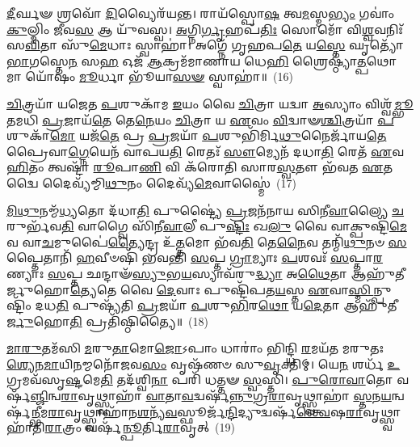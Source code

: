 \-\ul{𑌦𑍀}\-𑌰𑍍𑌘𑍟 𑌶𑍍𑌰𑌵𑍋᳴ \ul{𑌦𑌿}\-𑌵𑍍𑌯𑍈𑌰᳴𑌯𑌨𑍍𑌤। 𑌰𑌾𑌯᳴𑌸𑍍𑌪𑍋\-\ul{𑌷} 𑌤𑍍𑌵\-\ul{𑌮}\-𑌸𑍍𑌮\-\ul{𑌭𑍍𑌯𑌂} 𑌗𑌵𑌾𑌂॑ \ul{𑌕𑍁}\-𑌲𑍍𑌮𑌿𑌂 \ul{𑌜𑍀}\-𑌵\-\ul{𑌸} 𑌆 𑌯𑍁᳴𑌵𑌸𑍍𑌵। \ul{𑌅}\-𑌗𑍍𑌨𑌿\-\ul{𑌰𑍍𑌗𑍃}\-𑌹𑌪᳴\-\ul{𑌤𑌿𑌃} 𑌸𑍋𑌮𑍋᳴ 𑌵𑌿\-\ul{𑌶𑍍𑌵}\-𑌵𑌨𑌿𑌃᳴ 𑌸\-\ul{𑌵𑌿}\-𑌤𑌾 𑌸𑍁᳴\-\ul{𑌮𑍇}\-𑌧𑌾𑌃 𑌸𑍍𑌵𑌾𑌹𑌾॑। 𑌅𑌗𑍍𑌨𑍇᳴ 𑌗𑍃𑌹𑌪\-\ul{𑌤𑍇} 𑌯\-\ul{𑌸𑍍𑌤𑍇} 𑌘𑍃𑌤𑍍𑌯𑍋᳴ \ul{𑌭𑌾}\-𑌗𑌸𑍍𑌤𑍇\-\ul{𑌨} 𑌸\-\ul{𑌹} 𑌓𑌜᳴ \ul{𑌆}\-𑌕𑍍𑌰𑌮᳴𑌮𑌾𑌣𑌾𑌯 𑌧𑍇\-\ul{𑌹𑌿} 𑌶𑍍𑌰𑍈𑌷𑍍𑌠𑍍𑌯𑌾॑\-\ul{𑌤𑍍𑌪}\-𑌥𑍋 𑌮𑌾 𑌯𑍋᳴𑌷𑌂 \ul{𑌮𑍂}\-𑌰𑍍𑌧𑌾 𑌭𑍂᳴𑌯𑌾\-\ul{𑌸}\-\-\ul{𑍟} 𑌸𑍍𑌵𑌾𑌹𑌾॑॥~(16)

{\anuvakamend[{\-\ul{𑌅}\-𑌮𑍃𑌤᳴\-\ul{𑌮}\-𑌷𑍍𑌟𑌾𑌤𑍍𑌰𑌿𑍞᳴𑌶𑌚𑍍𑌚}]}%

\-\ul{𑌚𑌿}\-𑌤𑍍𑌰𑌯𑌾᳴ 𑌯𑌜𑍇𑌤 \ul{𑌪}\-𑌶𑍁𑌕𑌾᳴𑌮 \ul{𑌇}\-𑌯𑌂 𑌵𑍈 \ul{𑌚𑌿}\-𑌤𑍍𑌰𑌾 𑌯𑌦𑍍𑌵𑌾 \ul{𑌅}\-𑌸𑍍𑌯𑌾𑌂 𑌵𑌿𑌶𑍍𑌵᳴\-\ul{𑌮𑍍𑌭𑍂}\-𑌤𑌮𑌧𑌿᳴ \ul{𑌪𑍍𑌰}\-𑌜𑌾𑌯᳴\-\ul{𑌤𑍇} 𑌤𑍇\-\ul{𑌨𑍇}\-𑌯𑌂 \ul{𑌚𑌿}\-𑌤𑍍𑌰𑌾 𑌯 \ul{𑌏}\-𑌵𑌂 \ul{𑌵𑌿}\-𑌦𑍍𑌵𑌾𑍟\-\ul{𑌶𑍍𑌚𑌿}\-𑌤𑍍𑌰𑌯𑌾᳴ \ul{𑌪}\-𑌶𑍁𑌕𑌾᳴\-\ul{𑌮𑍋} 𑌯𑌜᳴\-\ul{𑌤𑍇} 𑌪𑍍𑌰 \ul{𑌪𑍍𑌰}\-𑌜𑌯𑌾᳴ \ul{𑌪}\-𑌶𑍁𑌭𑌿᳴𑌰𑍍𑌮𑌿\-\ul{𑌥𑍁}\-𑌨𑍈𑌰𑍍𑌜𑌾᳴𑌯\-\ul{𑌤𑍇} 𑌪𑍍𑌰𑍈𑌵𑌾\-\ul{𑌗𑍍𑌨𑍇}\-𑌯𑍇𑌨᳴ 𑌵𑌾𑌪𑌯\-\ul{𑌤𑌿} 𑌰𑍇𑌤𑌃᳴ \ul{𑌸𑍗}\-𑌮𑍍𑌯𑍇𑌨᳴ 𑌦𑌧𑌾\-\ul{𑌤𑌿} 𑌰𑍇𑌤᳴ \ul{𑌏}\-𑌵 \ul{𑌹𑌿}\-𑌤𑌂 𑌤𑍍𑌵𑌷𑍍𑌟𑌾᳴ \ul{𑌰𑍂}\-𑌪𑌾\-\ul{𑌣𑌿} 𑌵𑌿 𑌕᳴𑌰𑍋𑌤𑌿 𑌸𑌾𑌰\-\ul{𑌸𑍍𑌵}\-𑌤𑍗 𑌭᳴𑌵𑌤 \ul{𑌏}\-𑌤𑌦𑍍𑌵𑍈 𑌦𑍈𑌵𑍍𑌯᳴𑌮𑍍𑌮𑌿\-\ul{𑌥𑍁}\-𑌨𑌂 𑌦𑍈𑌵𑍍𑌯᳴\-\ul{𑌮𑍇}\-𑌵𑌾𑌸𑍍𑌮𑍈॑~(17)

\-\ul{𑌮𑌿}\-\-\ul{𑌥𑍁}\-𑌨𑌮𑍍𑌮᳴\-\ul{𑌧𑍍𑌯}\-𑌤𑍋 𑌦᳴𑌧𑌾\-\ul{𑌤𑌿} 𑌪𑍁𑌷𑍍𑌟𑍍𑌯𑍈॑ \ul{𑌪𑍍𑌰}\-𑌜𑌨᳴𑌨𑌾𑌯 𑌸𑌿𑌨𑍀\-\ul{𑌵𑌾}\-𑌲𑍍𑌯𑍈 \ul{𑌚}\-𑌰𑍁𑌰𑍍𑌭᳴𑌵\-\ul{𑌤𑌿} 𑌵𑌾𑌗𑍍𑌵𑍈 𑌸𑌿᳴𑌨𑍀\-\ul{𑌵𑌾}\-𑌲𑍀 𑌪𑍁\-\ul{𑌷𑍍𑌟𑌿𑌃} 𑌖\-\ul{𑌲𑍁} 𑌵𑍈 𑌵𑌾𑌕𑍍𑌪𑍁𑌷𑍍𑌟𑌿᳴\-\ul{𑌮𑍇}\-𑌵 𑌵𑌾\-\ul{𑌚}\-𑌮𑍁𑌪𑍈॑\-\ul{𑌤𑍍𑌯𑍈}\-𑌨𑍍𑌦𑍍𑌰 𑌉᳴\-\ul{𑌤𑍍𑌤}\-𑌮𑍋 𑌭᳴𑌵\-\ul{𑌤𑌿} 𑌤𑍇\-\ul{𑌨𑍈}\-𑌵 𑌤𑌨𑍍𑌮𑌿᳴\-\ul{𑌥𑍁}\-𑌨𑍞 \ul{𑌸}\-𑌪𑍍𑌤𑍈𑌤𑌾𑌨𑌿᳴ \ul{𑌹}\-𑌵𑍀𑍞𑌷𑌿᳴ 𑌭𑌵𑌨𑍍𑌤𑌿 \ul{𑌸}\-𑌪𑍍𑌤 \ul{𑌗𑍍𑌰𑌾}\-𑌮𑍍𑌯𑌾𑌃 \ul{𑌪}\-𑌶𑌵𑌃᳴ \ul{𑌸}\-𑌪𑍍𑌤𑌾\-\ul{𑌰}\-𑌣𑍍𑌯𑌾𑌃 \ul{𑌸}\-𑌪𑍍𑌤 𑌛𑌨𑍍𑌦𑌾𑍟᳴\-\ul{𑌸𑍍𑌯𑍁}\-𑌭\-\ul{𑌯}\-𑌸𑍍𑌯𑌾𑌵᳴𑌰𑍁\-\ul{𑌦𑍍𑌧𑍍𑌯𑌾} 𑌅\-\ul{𑌥𑍈}\-𑌤𑌾 𑌆𑌹𑍁᳴𑌤𑍀𑌰𑍍𑌜𑍁𑌹𑍋\-\ul{𑌤𑍍𑌯𑍇}\-𑌤𑍇 𑌵𑍈 \ul{𑌦𑍇}\-𑌵𑌾𑌃 𑌪𑍁𑌷𑍍𑌟𑌿᳴𑌪𑌤\-\ul{𑌯}\-𑌸𑍍𑌤 \ul{𑌏}\-𑌵𑌾\-\ul{𑌸𑍍𑌮𑌿}\-𑌨𑍍𑌪𑍁𑌷𑍍𑌟𑌿𑌂᳴ 𑌦𑌧\-\ul{𑌤𑌿} 𑌪𑍁𑌷𑍍𑌯᳴𑌤𑌿 \ul{𑌪𑍍𑌰}\-𑌜𑌯𑌾᳴ \ul{𑌪}\-𑌶𑍁\-\ul{𑌭𑌿}\-𑌰\-\ul{𑌥𑍋} 𑌯\-\ul{𑌦𑍇}\-𑌤𑌾 𑌆𑌹𑍁᳴𑌤𑍀\-\ul{𑌰𑍍𑌜𑍁}\-𑌹𑍋\-\ul{𑌤𑌿} 𑌪𑍍𑌰𑌤𑌿᳴𑌷𑍍𑌠𑌿𑌤𑍍𑌯𑍈॥~(18)

{\anuvakamend[{\-\ul{𑌅}\-\-\ul{𑌸𑍍𑌮𑍈} 𑌤 \ul{𑌏}\-𑌵 𑌦𑍍𑌵𑌾𑌦᳴𑌶 𑌚}]}%

\-\ul{𑌮𑌾}\-\-\ul{𑌰𑍁}\-𑌤𑌮᳴𑌸𑌿 \ul{𑌮}\-𑌰𑍁\-\ul{𑌤𑌾}\-𑌮𑍋\-\ul{𑌜𑍋}\-\-𑌽𑌪𑌾𑌂 𑌧𑌾𑌰𑌾𑌂॑ 𑌭𑌿𑌨𑍍𑌦𑍍𑌧𑌿 \ul{𑌰}\-𑌮𑌯᳴𑌤 𑌮𑌰𑍁𑌤𑌃 \ul{𑌶𑍍𑌯𑍇}\-𑌨\-\ul{𑌮𑌾}\-𑌯𑌿\-\ul{𑌨}\-𑌮𑍍𑌮𑌨𑍋᳴𑌜𑌵\-\ul{𑌸𑌂} 𑌵𑍃𑌷᳴𑌣𑍞 𑌸𑍁\-\ul{𑌵𑍃}\-𑌕𑍍𑌤𑌿𑌮𑍍। 𑌯𑍇\-\ul{𑌨} 𑌶𑌰𑍍𑌧᳴ \ul{𑌉}\-𑌗𑍍𑌰𑌮𑌵᳴𑌸𑍃\-\ul{𑌷𑍍𑌟}\-𑌮𑍇\-\ul{𑌤𑌿} 𑌤𑌦᳴𑌶𑍍𑌵𑌿\-\ul{𑌨𑌾} 𑌪𑌰𑌿᳴ 𑌧𑌤𑍍𑌤𑍟 \ul{𑌸𑍍𑌵}\-𑌸𑍍𑌤𑌿। \ul{𑌪𑍁}\-\-\ul{𑌰𑍋}\-\-\ul{𑌵𑌾}\-𑌤𑍋 𑌵𑌰𑍍\mbox{}𑌷᳴\-\ul{𑌞𑍍𑌜𑌿}\-𑌨𑍍𑌵\-\ul{𑌰𑌾}\-𑌵𑍃𑌥𑍍𑌸𑍍𑌵𑌾𑌹𑌾᳴ \ul{𑌵𑌾}\-𑌤𑌾\-\ul{𑌵}\-𑌦𑍍𑌵𑌰𑍍\mbox{}𑌷᳴\-\ul{𑌨𑍍𑌨𑍁}\-𑌗𑍍𑌰\-\ul{𑌰𑌾}\-𑌵𑍃𑌥𑍍𑌸𑍍𑌵𑌾𑌹𑌾॑ \ul{𑌸𑍍𑌤}\-𑌨\-\ul{𑌯}\-𑌨𑍍𑌵𑌰𑍍\mbox{}𑌷᳴\-\ul{𑌨𑍍𑌭𑍀}\-𑌮\-\ul{𑌰𑌾}\-𑌵𑍃𑌥𑍍𑌸𑍍𑌵𑌾𑌹𑌾᳴𑌨\-\ul{𑌶}\-𑌨𑍍𑌯᳴\-\ul{𑌵}\-𑌸𑍍𑌫𑍂𑌰𑍍𑌜᳴\-\ul{𑌨𑍍𑌦𑌿}\-𑌦𑍍𑌯𑍁𑌦𑍍𑌵𑌰𑍍\mbox{}𑌷᳴\-\ul{𑌨𑍍𑌤𑍍𑌵𑍇}\-𑌷\-\ul{𑌰𑌾}\-𑌵𑍃𑌥𑍍𑌸𑍍𑌵𑌾𑌹𑌾᳴𑌤𑌿\-\ul{𑌰𑌾}\-𑌤𑍍𑌰𑌂 𑌵𑌰𑍍\mbox{}𑌷᳴\-\ul{𑌨𑍍𑌪𑍂}\-𑌰𑍍𑌤𑌿\-\ul{𑌰𑌾}\-𑌵𑍃𑌤𑍍~(19)

